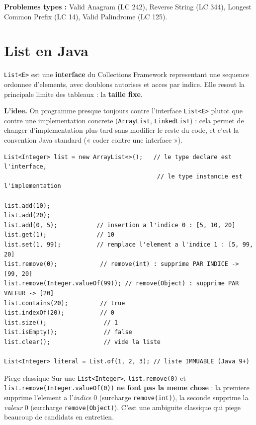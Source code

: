 \documentclass[11pt,a4paper]{article}
\newcommand{\leetcode}[1]{\noindent\textbf{Problemes types :} #1\par\medskip}
\begin{document}
\leetcode{Valid Anagram (LC 242), Reverse String (LC 344), Longest Common Prefix (LC 14), Valid Palindrome (LC 125).}

\newpage
\section{List en Java}

\texttt{List<E>} est une \textbf{interface} du Collections Framework
representant une sequence ordonnee d'elements, avec doublons autorises et
acces par indice. Elle resout la principale limite des tableaux : la
\textbf{taille fixe}.

\textbf{L'idee.} On programme presque toujours contre l'interface
\texttt{List<E>} plutot que contre une implementation concrete
(\texttt{ArrayList}, \texttt{LinkedList}) : cela permet de changer
d'implementation plus tard sans modifier le reste du code, et c'est la
convention Java standard (« coder contre une interface »).

\begin{lstlisting}
List<Integer> list = new ArrayList<>();   // le type declare est l'interface,
                                           // le type instancie est l'implementation

list.add(10);
list.add(20);
list.add(0, 5);           // insertion a l'indice 0 : [5, 10, 20]
list.get(1);              // 10
list.set(1, 99);          // remplace l'element a l'indice 1 : [5, 99, 20]
list.remove(0);            // remove(int) : supprime PAR INDICE -> [99, 20]
list.remove(Integer.valueOf(99)); // remove(Object) : supprime PAR VALEUR -> [20]
list.contains(20);         // true
list.indexOf(20);          // 0
list.size();                // 1
list.isEmpty();             // false
list.clear();               // vide la liste

List<Integer> literal = List.of(1, 2, 3); // liste IMMUABLE (Java 9+)
\end{lstlisting}

\begin{infobox}{Piege classique}
Sur une \texttt{List<Integer>}, \texttt{list.remove(0)} et
\texttt{list.remove(Integer.valueOf(0))} \textbf{ne font pas la meme chose} :
la premiere supprime l'element a l'\emph{indice} 0 (surcharge
\texttt{remove(int)}), la seconde supprime la \emph{valeur} 0 (surcharge
\texttt{remove(Object)}). C'est une ambiguite classique qui piege beaucoup de
candidats en entretien.
\end{infobox}
\end{document}
